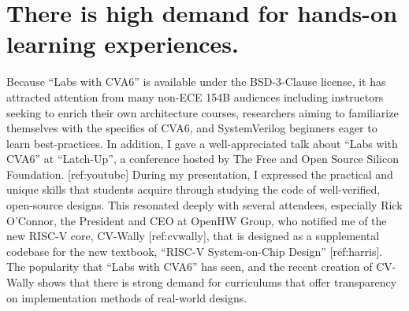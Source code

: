 \section{There is high demand for hands-on learning experiences.}

Because ``Labs with CVA6'' is available under the BSD-3-Clause license, it has attracted attention from many non-ECE 154B audiences including instructors seeking to enrich their own architecture courses, researchers aiming to familiarize themselves with the specifics of CVA6, and SystemVerilog beginners eager to learn best-practices. In addition, I gave a well-appreciated talk about ``Labs with CVA6'' at ``Latch-Up'', a conference hosted by The Free and Open Source Silicon Foundation. [ref:youtube] During my presentation, I expressed the practical and unique skills that students acquire through studying the code of well-verified, open-source designs. This resonated deeply with several attendees, especially Rick O'Connor, the President and CEO at OpenHW Group, who notified me of the new RISC-V core, CV-Wally [ref:cvwally], that is designed as a supplemental codebase for the new textbook, ``RISC-V System-on-Chip Design'' [ref:harris]. The popularity that ``Labs with CVA6'' has seen, and the recent creation of CV-Wally shows that there is strong demand for curriculums that offer transparency on implementation methods of real-world designs.

